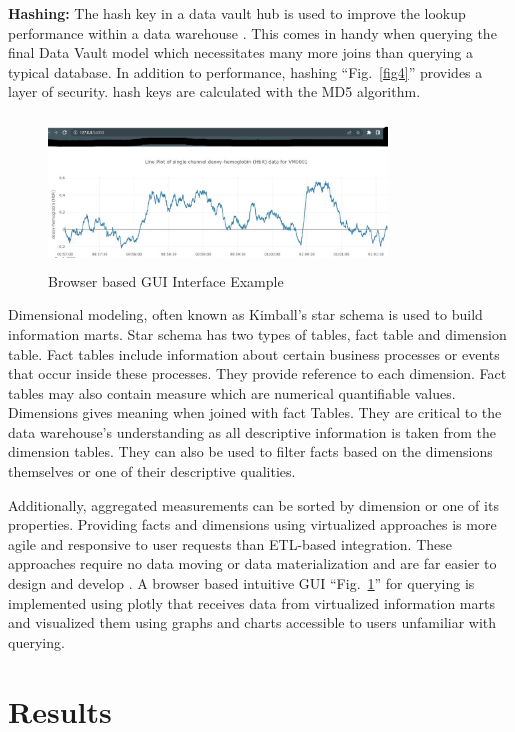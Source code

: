 \documentclass[conference]{IEEEtran}
\begin{document}
\smallskip
\noindent
\textbf{Hashing:} The hash key in a data vault hub is used to improve the lookup performance within a data warehouse \cite{b5}. This comes in handy when querying the final Data Vault model which necessitates many more joins than querying a typical database. In addition to performance, hashing ``Fig.~\ref{fig4}'' provides a layer of security. hash keys are calculated with the MD5 algorithm.

\begin{figure}[htbp]
\centerline{\includegraphics[width=9cm, height=4cm]{Figure5.png}}
\caption{Browser based GUI Interface Example}
\label{fig5}
\end{figure}

Dimensional modeling, often known as Kimball's star schema is used to build information marts. Star schema has two types of tables, fact table and dimension table. Fact tables include information about certain business processes or events that occur inside these processes. They provide reference to each dimension. Fact tables may also contain measure which are numerical quantifiable values. Dimensions gives meaning when joined with fact Tables. They are critical to the data warehouse's understanding as all descriptive information is taken from the dimension tables. They can also be used to filter facts based on the dimensions themselves or one of their descriptive qualities. 

Additionally, aggregated measurements can be sorted by dimension or one of its properties. Providing facts and dimensions using virtualized approaches is more agile and responsive to user requests than ETL-based integration. These approaches require no data
moving or data materialization and are far easier to design and develop \cite{b6}. A browser based intuitive GUI ``Fig.~\ref{fig5}'' for querying is implemented using plotly that receives data from virtualized information marts and visualized them using graphs and charts accessible to users unfamiliar with querying.


\section{Results}
\end{document}
